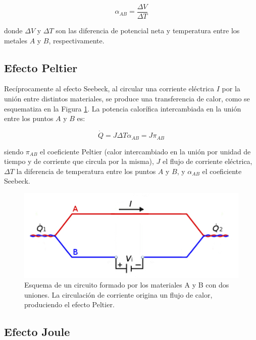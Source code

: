 \documentclass[twoside,twocolumn,a4paper]{article}
\begin{document}
\begin{equation}
\label{eq:seebeck2}
\alpha_{AB} = \frac{\Delta V}{\Delta T}
\end{equation}

donde $\Delta V$ y $\Delta T$ son las diferencia de potencial neta  y temperatura entre los metales $A$ y $B$, respectivamente.

\subsection{Efecto Peltier}

Rec\'iprocamente al efecto Seebeck, al circular una corriente el\'ectrica $I$ por la uni\'on entre distintos materiales, se produce una transferencia de calor, como se esquematiza en la Figura \ref{fig:peltier}. La potencia calor\'ifica intercambiada en la uni\'on entre los puntos $A$ y $B$ es:

\begin{equation}
\label{eq:peltier}
\dot{Q} = J\Delta T \alpha_{AB} = J \pi_{AB}
\end{equation}

siendo $\pi_{AB}$ el coeficiente Peltier (calor intercambiado en la uni\'on por unidad de tiempo y de corriente que circula por la misma), $J$ el flujo de corriente el\'ectrica, $\Delta T$ la diferencia de temperatura entre los puntos $A$ y $B$, y $\alpha_{AB}$ el coeficiente Seebeck.


\begin{figure}[H]
\includegraphics[width=\linewidth]{peltier.jpg}
\caption{Esquema de un circuito formado por los materiales A y B con dos uniones. La circulaci\'on de corriente origina un flujo de calor, produciendo el efecto Peltier.}
\label{fig:peltier}
\end{figure}

\subsection{Efecto Joule}
\end{document}
